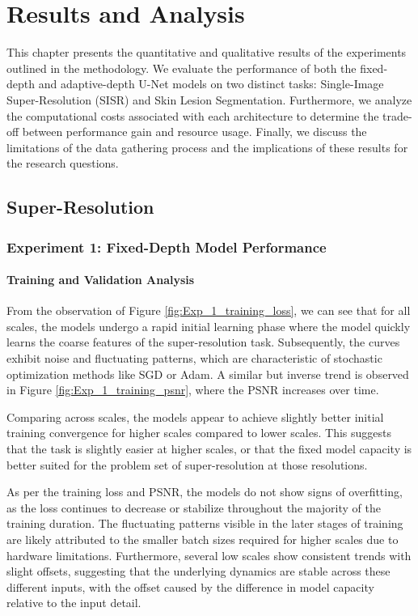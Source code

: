 \chapter{Results and Analysis}
\label{chap:results}

This chapter presents the quantitative and qualitative results of the experiments outlined in the methodology. We evaluate the performance of both the fixed-depth and adaptive-depth U-Net models on two distinct tasks: Single-Image Super-Resolution (SISR) and Skin Lesion Segmentation. Furthermore, we analyze the computational costs associated with each architecture to determine the trade-off between performance gain and resource usage. Finally, we discuss the limitations of the data gathering process and the implications of these results for the research questions.

\section{Super-Resolution}

    \subsection{Experiment 1: Fixed-Depth Model Performance}

        \subsubsection{Training and Validation Analysis}

        From the observation of Figure \ref{fig:Exp_1_training_loss}, we can see that for all scales, the models undergo a rapid initial learning phase where the model quickly learns the coarse features of the super-resolution task. Subsequently, the curves exhibit noise and fluctuating patterns, which are characteristic of stochastic optimization methods like SGD or Adam. A similar but inverse trend is observed in Figure \ref{fig:Exp_1_training_psnr}, where the PSNR increases over time.

        Comparing across scales, the models appear to achieve slightly better initial training convergence for higher scales compared to lower scales. This suggests that the task is slightly easier at higher scales, or that the fixed model capacity is better suited for the problem set of super-resolution at those resolutions.

        As per the training loss and PSNR, the models do not show signs of overfitting, as the loss continues to decrease or stabilize throughout the majority of the training duration. The fluctuating patterns visible in the later stages of training are likely attributed to the smaller batch sizes required for higher scales due to hardware limitations. Furthermore, several low scales show consistent trends with slight offsets, suggesting that the underlying dynamics are stable across these different inputs, with the offset caused by the difference in model capacity relative to the input detail.

